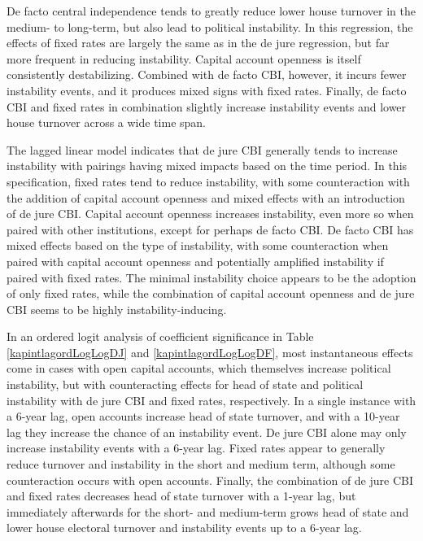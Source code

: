 \documentclass{article}
\begin{document}
    De facto central independence tends to greatly reduce lower house turnover in the medium- to long-term, but also lead to political instability. In this regression, the effects of fixed rates are largely the same as in the de jure regression, but far more frequent in reducing instability. Capital account openness is itself consistently destabilizing. Combined with de facto CBI, however, it incurs fewer instability events, and it produces mixed signs with fixed rates. Finally, de facto CBI and fixed rates in combination slightly increase instability events and lower house turnover across a wide time span.

    The lagged linear model indicates that de jure CBI generally tends to increase instability with pairings having mixed impacts based on the time period. In this specification, fixed rates tend to reduce instability, with some counteraction with the addition of capital account openness and mixed effects with an introduction of de jure CBI. Capital account openness increases instability, even more so when paired with other institutions, except for perhaps de facto CBI. De facto CBI has mixed effects based on the type of instability, with some counteraction when paired with capital account openness and potentially amplified instability if paired with fixed rates. The minimal instability choice appears to be the adoption of only fixed rates, while the combination of capital account openness and de jure CBI seems to be highly instability-inducing.

    In an ordered logit analysis of coefficient significance in Table \ref*{kapintlagordLogLogDJ} and \ref*{kapintlagordLogLogDF}, most instantaneous effects come in cases with open capital accounts, which themselves increase political instability, but with counteracting effects for head of state and political instability with de jure CBI and fixed rates, respectively. In a single instance with a 6-year lag, open accounts increase head of state turnover, and with a 10-year lag they increase the chance of an instability event. De jure CBI alone may only increase instability events with a 6-year lag. Fixed rates appear to generally reduce turnover and instability in the short and medium term, although some counteraction occurs with open accounts. Finally, the combination of de jure CBI and fixed rates decreases head of state turnover with a 1-year lag, but immediately afterwards for the short- and medium-term grows head of state and lower house electoral turnover and instability events up to a 6-year lag.
\end{document}
